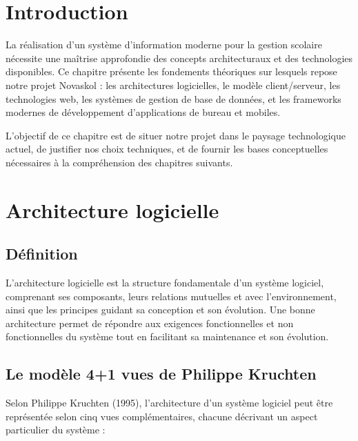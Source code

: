 \documentclass[12pt,a4paper,twoside]{report}
\begin{document}
\section{Introduction}

La réalisation d'un système d'information moderne pour la gestion scolaire nécessite une maîtrise approfondie des concepts architecturaux et des technologies disponibles. Ce chapitre présente les fondements théoriques sur lesquels repose notre projet Novaskol : les architectures logicielles, le modèle client/serveur, les technologies web, les systèmes de gestion de base de données, et les frameworks modernes de développement d'applications de bureau et mobiles.

L'objectif de ce chapitre est de situer notre projet dans le paysage technologique actuel, de justifier nos choix techniques, et de fournir les bases conceptuelles nécessaires à la compréhension des chapitres suivants.

\section{Architecture logicielle}

\subsection{Définition}

L'architecture logicielle est la structure fondamentale d'un système logiciel, comprenant ses composants, leurs relations mutuelles et avec l'environnement, ainsi que les principes guidant sa conception et son évolution. Une bonne architecture permet de répondre aux exigences fonctionnelles et non fonctionnelles du système tout en facilitant sa maintenance et son évolution.

\subsection{Le modèle 4+1 vues de Philippe Kruchten}

Selon Philippe Kruchten (1995), l'architecture d'un système logiciel peut être représentée selon cinq vues complémentaires, chacune décrivant un aspect particulier du système :
\end{document}
